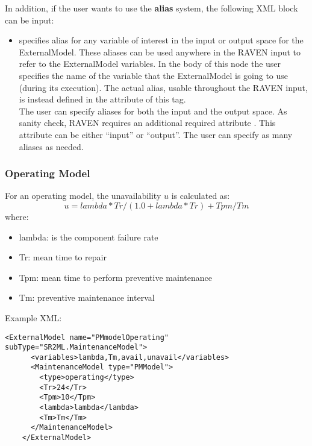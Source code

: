 In addition, if the user wants to use the \textbf{alias} system, the following XML block can be input:
\begin{itemize}
	\item {}  specifies alias for
	any variable of interest in the input or output space for the ExternalModel.
	These aliases can be used anywhere in the RAVEN input to refer to the ExternalModel
	variables.
	In the body of this node the user specifies the name of the variable that the ExternalModel is
	going to use (during its execution).
	The actual alias, usable throughout the RAVEN input, is instead defined in the
	 attribute of this tag.
	\\The user can specify aliases for both the input and the output space. As sanity check, RAVEN
	requires an additional required attribute . This attribute can be either ``input'' or ``output''.
	\nb The user can specify as many aliases as needed.
\end{itemize}


\subsubsection{Operating Model}
For an operating model, the unavailability $u$ is calculated as: 
\begin{equation}
	u = lambda*Tr/(1.0+lambda*Tr) + Tpm/Tm
\end{equation}
where:
\begin{itemize}
  \item lambda: is the component failure rate
  \item Tr: mean time to repair
  \item Tpm: mean time to perform preventive maintenance
  \item Tm: preventive maintenance interval
\end{itemize}

Example XML:
\begin{lstlisting}[style=XML]
    <ExternalModel name="PMmodelOperating" subType="SR2ML.MaintenanceModel">
      <variables>lambda,Tm,avail,unavail</variables>
      <MaintenanceModel type="PMModel">
        <type>operating</type>
        <Tr>24</Tr>
        <Tpm>10</Tpm>
        <lambda>lambda</lambda>
        <Tm>Tm</Tm>
      </MaintenanceModel>
    </ExternalModel>
\end{lstlisting}

